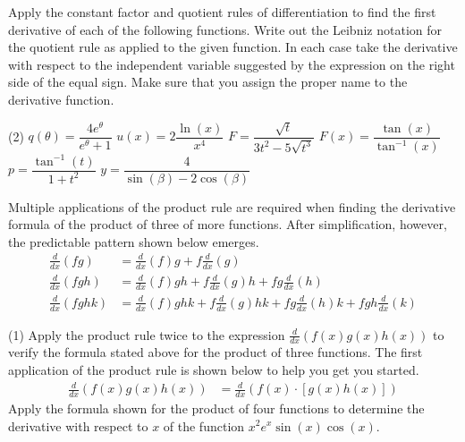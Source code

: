 \documentclass[12pt,]{book}
\theoremstyle{plain}
\theoremstyle{definition}
\numberwithin{equation}{section}
\newcommand{\fe}[2]{#1\mathopen{}\left(#2\right)\mathclose{}}
\newcommand{\lzoo}[2]{{\frac{d}{d#1}}{\left(#2\right)}}
\begin{document}
\par\smallskip\noindent
\hypertarget{exercisegroup-86}{\null}Apply the constant factor and quotient rules of differentiation to find the first derivative of each of the following functions.   Write out the Leibniz notation for the quotient rule as applied to the given function. In each case take the derivative with respect to the independent variable suggested by the expression on the right side of the equal sign.  Make sure that you assign the proper name to the derivative function.%
\par
\begin{exercisegroup}(2)
\exercise[13.]\hypertarget{exercise-413}{\null}\(\fe{q}{\theta}=\dfrac{4e^{\theta}}{e^\theta+1}\)%
\exercise[14.]\hypertarget{exercise-414}{\null}\(\fe{u}{x}=2\dfrac{\fe{\ln}{x}}{x^4}\)%
\exercise[15.]\hypertarget{exercise-415}{\null}\(F=\dfrac{\sqrt{t}}{3t^2-5\sqrt{t^3}}\)%
\exercise[16.]\hypertarget{exercise-416}{\null}\(\fe{F}{x}=\dfrac{\fe{\tan}{x}}{\fe{\tan^{-1}}{x}}\)%
\exercise[17.]\hypertarget{exercise-417}{\null}\(p=\dfrac{\fe{\tan^{-1}}{t}}{1+t^2}\)%
\exercise[18.]\hypertarget{exercise-418}{\null}\(y=\dfrac{4}{\fe{\sin}{\beta}-2\fe{\cos}{\beta}}\)%
\end{exercisegroup}
\par\smallskip\noindent
\hypertarget{exercisegroup-87}{\null}Multiple applications of the product rule are required when finding the derivative formula of the product of three of more functions.  After simplification, however, the predictable pattern shown below emerges.\begin{align*}
\lzoo{x}{fg}&=\lzoo{x}{f}g+f\lzoo{x}{g}\\
\lzoo{x}{fgh}&=\lzoo{x}{f}gh+f\lzoo{x}{g}h+fg\lzoo{x}{h}\\
\lzoo{x}{fghk}&=\lzoo{x}{f}ghk+f\lzoo{x}{g}hk+fg\lzoo{x}{h}k+fgh\lzoo{x}{k}
\end{align*}%
\par
\begin{exercisegroup}(1)
\exercise[19.]\hypertarget{exercise-419}{\null}Apply the product rule twice to the expression \(\lzoo{x}{\fe{f}{x}\fe{g}{x}\fe{h}{x}}\)  to verify the 
formula stated above for the product of three functions.  The first application of the product rule is shown below to help you get you started.\begin{align*}
\lzoo{x}{\fe{f}{x}\fe{g}{x}\fe{h}{x}}&=\lzoo{x}{\fe{f}{x}\cdot\left[\fe{g}{x}\fe{h}{x}\right]}
\end{align*}%
\exercise[20.]\hypertarget{exercise-420}{\null}Apply the formula shown for the product of four functions to determine the derivative with respect to \(x\) of the function \(x^2e^x\fe{\sin}{x}\fe{\cos}{x}\).%
\end{exercisegroup}
\end{document}

